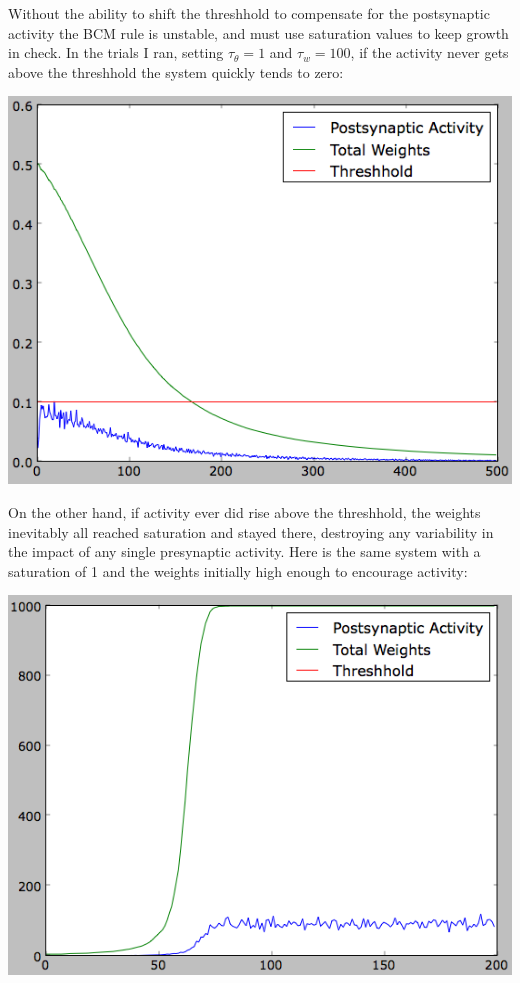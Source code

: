 \documentclass[12pt]{article}
\begin{document}
Without the ability to shift the threshhold to compensate for the postsynaptic activity the BCM rule is unstable, and must use saturation values to keep growth in check.  In the trials I ran, setting $\tau_\theta=1$ and $\tau_w=100$, if the activity never gets above the threshhold the system quickly tends to zero:

\vspace{15pt}
\includegraphics[scale=0.5]{static.png}
\vspace{15pt}

On the other hand, if activity ever did rise above the threshhold, the weights inevitably all reached saturation and stayed there, destroying any variability in the impact of any single presynaptic activity.  Here is the same system with a saturation of 1 and the weights initially high enough to encourage activity:

\vspace{15pt}
\includegraphics[scale=0.5]{staticgrowth.png}
\vspace{15pt}
\end{document}
